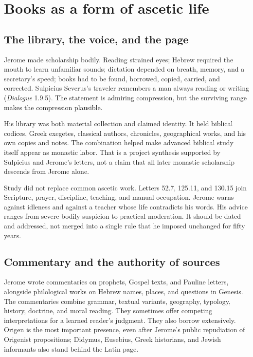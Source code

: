 \section{Books as a form of ascetic life}\label{sec:jerome-writings}

\subsection{The library, the voice, and the page}

Jerome made scholarship bodily. Reading strained eyes; Hebrew required the
mouth to learn unfamiliar sounds; dictation depended on breath, memory, and a
secretary's speed; books had to be found, borrowed, copied, carried, and
corrected. Sulpicius Severus's traveler remembers a man always reading or
writing (\emph{Dialogue} 1.9.5). The statement is admiring compression, but the
surviving range makes the compression plausible.

His library was both material collection and claimed identity. It held biblical
codices, Greek exegetes, classical authors, chronicles, geographical works, and
his own copies and notes. The combination helped make advanced biblical study
itself appear as monastic labor. That is a project synthesis supported by
Sulpicius and Jerome's letters, not a claim that all later monastic scholarship
descends from Jerome alone.

Study did not replace common ascetic work. Letters 52.7, 125.11, and 130.15
join Scripture, prayer, discipline, teaching, and manual occupation. Jerome
warns against idleness and against a teacher whose life contradicts his words.
His advice ranges from severe bodily suspicion to practical moderation. It
should be dated and addressed, not merged into a single rule that he imposed
unchanged for fifty years.

\subsection{Commentary and the authority of sources}

Jerome wrote commentaries on prophets, Gospel texts, and Pauline letters,
alongside philological works on Hebrew names, places, and questions in Genesis.
The commentaries combine grammar, textual variants, geography, typology,
history, doctrine, and moral reading. They sometimes offer competing
interpretations for a learned reader's judgment. They also borrow extensively.
Origen is the most important presence, even after Jerome's public repudiation
of Origenist propositions; Didymus, Eusebius, Greek historians, and Jewish
informants also stand behind the Latin page.

